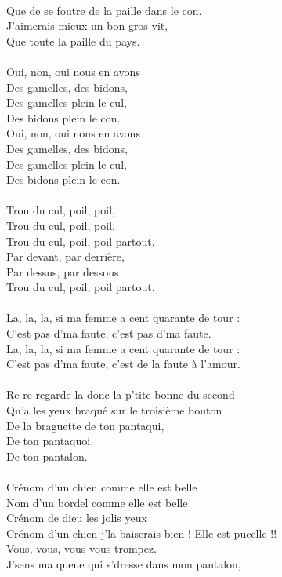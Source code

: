 \\Que de se foutre de la paille dans le con.
\\J'aimerais mieux un bon gros vit,
\\Que toute la paille du pays.
\\\\Oui, non, oui nous en avons
\\Des gamelles, des bidons,
\\Des gamelles plein le cul,
\\Des bidons plein le con.
\\Oui, non, oui nous en avons
\\Des gamelles, des bidons,
\\Des gamelles plein le cul,
\\Des bidons plein le con.
\\\\Trou du cul, poil, poil, 
\\Trou du cul, poil, poil,
\\Trou du cul, poil, poil partout.
\\Par devant, par derrière, 
\\Par dessus, par dessous
\\Trou du cul, poil, poil partout.
\\\\La, la, la, si ma femme a cent quarante de tour :
\\C'est pas d'ma faute, c'est pas d'ma faute.
\\La, la, la, si ma femme a cent quarante de tour :
\\C'est pas d'ma faute, c'est de la faute à l'amour.
\\\\Re re regarde-la donc la p'tite bonne du second
\\Qu'a les yeux braqué sur le troisième bouton
\\De la braguette de ton pantaqui,
\\De ton pantaquoi,
\\De ton pantalon.
\\\\Crénom d'un chien comme elle est belle 
\\Nom d'un bordel comme elle est belle
\\Crénom de dieu les jolis yeux 
\\Crénom d'un chien j'la baiserais bien !
\breakpage
Elle est pucelle !!
\\Vous, vous, vous vous trompez.
\\J'sens ma queue qui s'dresse dans mon pantalon,
